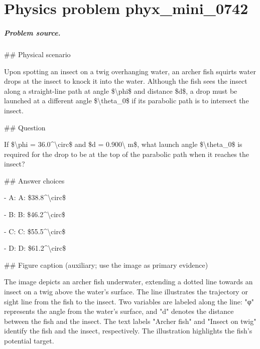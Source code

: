 
\chapter{Physics problem phyx\_mini\_0742}
\label{ch:PhyXMiniProblems_problem_phyx_mini_0742}

\paragraph{Problem source.}
\#\# Physical scenario

Upon spotting an insect on a twig overhanging water, an archer fish squirts water drops at the insect to knock it into the water. Although the fish sees the insect along a straight-line path at angle \$\textbackslash{}phi\$ and distance \$d\$, a drop must be launched at a different angle \$\textbackslash{}theta\_0\$ if its parabolic path is to intersect the insect.

\#\# Question

If \$\textbackslash{}phi = 36.0\textasciicircum{}\textbackslash{}circ\$ and \$d = 0.900\textbackslash{} m\$, what launch angle \$\textbackslash{}theta\_0\$ is required for the drop to be at the top of the parabolic path when it reaches the insect?

\#\# Answer choices

- A: A: \$38.8\textasciicircum{}\textbackslash{}circ\$

- B: B: \$46.2\textasciicircum{}\textbackslash{}circ\$

- C: C: \$55.5\textasciicircum{}\textbackslash{}circ\$

- D: D: \$61.2\textasciicircum{}\textbackslash{}circ\$

\#\# Figure caption (auxiliary; use the image as primary evidence)

The image depicts an archer fish underwater, extending a dotted line towards an insect on a twig above the water's surface. The line illustrates the trajectory or sight line from the fish to the insect. Two variables are labeled along the line: "φ" represents the angle from the water's surface, and "d" denotes the distance between the fish and the insect. The text labels "Archer fish" and "Insect on twig" identify the fish and the insect, respectively. The illustration highlights the fish's potential target.

